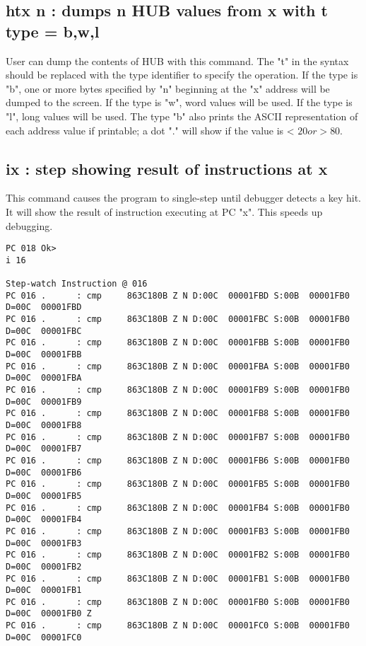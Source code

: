 \documentclass{article}
\numberwithin{equation}{section} %
\begin{document}
\subsection{htx n  : dumps n HUB values from x with t type = b,w,l}

User can dump the contents of HUB with this command. The "t" in the syntax should
be replaced with the type identifier to specify the operation. If the type is "b",
one or more bytes specified by "n" beginning at the "x" address will be dumped to
the screen. If the type is "w", word values will be used. If the type is "l", long
values will be used. The type "b" also prints the ASCII representation of each
address value if printable; a dot "." will show if the value is < $20 or > $80.


\subsection{ix     : step showing result of instructions at x}

This command causes the program to single-step until debugger detects a key hit.
It will show the result of instruction executing at PC "x". This speeds up debugging.

\begin{lstlisting}
PC 018 Ok>
i 16

Step-watch Instruction @ 016
PC 016 .      : cmp     863C180B Z N D:00C  00001FBD S:00B  00001FB0 D=00C  00001FBD
PC 016 .      : cmp     863C180B Z N D:00C  00001FBC S:00B  00001FB0 D=00C  00001FBC
PC 016 .      : cmp     863C180B Z N D:00C  00001FBB S:00B  00001FB0 D=00C  00001FBB
PC 016 .      : cmp     863C180B Z N D:00C  00001FBA S:00B  00001FB0 D=00C  00001FBA
PC 016 .      : cmp     863C180B Z N D:00C  00001FB9 S:00B  00001FB0 D=00C  00001FB9
PC 016 .      : cmp     863C180B Z N D:00C  00001FB8 S:00B  00001FB0 D=00C  00001FB8
PC 016 .      : cmp     863C180B Z N D:00C  00001FB7 S:00B  00001FB0 D=00C  00001FB7
PC 016 .      : cmp     863C180B Z N D:00C  00001FB6 S:00B  00001FB0 D=00C  00001FB6
PC 016 .      : cmp     863C180B Z N D:00C  00001FB5 S:00B  00001FB0 D=00C  00001FB5
PC 016 .      : cmp     863C180B Z N D:00C  00001FB4 S:00B  00001FB0 D=00C  00001FB4
PC 016 .      : cmp     863C180B Z N D:00C  00001FB3 S:00B  00001FB0 D=00C  00001FB3
PC 016 .      : cmp     863C180B Z N D:00C  00001FB2 S:00B  00001FB0 D=00C  00001FB2
PC 016 .      : cmp     863C180B Z N D:00C  00001FB1 S:00B  00001FB0 D=00C  00001FB1
PC 016 .      : cmp     863C180B Z N D:00C  00001FB0 S:00B  00001FB0 D=00C  00001FB0 Z
PC 016 .      : cmp     863C180B Z N D:00C  00001FC0 S:00B  00001FB0 D=00C  00001FC0
\end{lstlisting}
\end{document}
